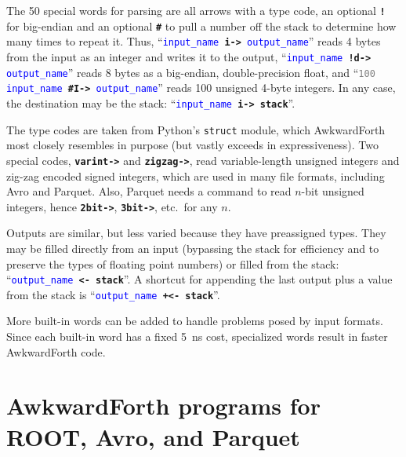 \documentclass{webofc}
\begin{document}
The 50 special words for parsing are all arrows with a type code, an optional \textcolor{OliveGreen}{\tt\textbf{!}} for big-endian and an optional \textcolor{OliveGreen}{\tt\textbf{\#}} to pull a number off the stack to determine how many times to repeat it. Thus, ``{\tt \textcolor{blue}{input\_name} \textcolor{OliveGreen}{\textbf{i->}} \textcolor{blue}{output\_name}}'' reads 4 bytes from the input as an integer and writes it to the output, ``{\tt \textcolor{blue}{input\_name} \textcolor{OliveGreen}{\textbf{!d->}} \textcolor{blue}{output\_name}}'' reads 8 bytes as a big-endian, double-precision float, and ``{\tt \textcolor{gray}{100} \textcolor{blue}{input\_name} \textcolor{OliveGreen}{\textbf{\#I->}} \textcolor{blue}{output\_name}}'' reads 100 unsigned 4-byte integers. In any case, the destination may be the stack: ``{\tt \textcolor{blue}{input\_name} \textcolor{OliveGreen}{\textbf{i->}} \textcolor{OliveGreen}{\textbf{stack}}}''.

The type codes are taken from Python's {\tt struct} module, which AwkwardForth most closely resembles in purpose (but vastly exceeds in expressiveness). Two special codes, \textcolor{OliveGreen}{\tt\textbf{varint->}} and \textcolor{OliveGreen}{\tt\textbf{zigzag->}}, read variable-length unsigned integers and zig-zag encoded signed integers, which are used in many file formats, including Avro and Parquet. Also, Parquet needs a command to read $n$-bit unsigned integers, hence \textcolor{OliveGreen}{\tt\textbf{2bit->}}, \textcolor{OliveGreen}{\tt\textbf{3bit->}}, etc.\ for any $n$.

Outputs are similar, but less varied because they have preassigned types. They may be filled directly from an input (bypassing the stack for efficiency and to preserve the types of floating point numbers) or filled from the stack: ``{\tt \textcolor{blue}{output\_name} \textcolor{OliveGreen}{\textbf{<-}} \textcolor{OliveGreen}{\textbf{stack}}}''. A shortcut for appending the last output plus a value from the stack is ``{\tt \textcolor{blue}{output\_name} \textcolor{OliveGreen}{\textbf{+<-}} \textcolor{OliveGreen}{\textbf{stack}}}''.

More built-in words can be added to handle problems posed by input formats. Since each built-in word has a fixed 5~ns cost, specialized words result in faster AwkwardForth code.

\section{AwkwardForth programs for ROOT, Avro, and Parquet}
\label{sec:programs}
\end{document}
